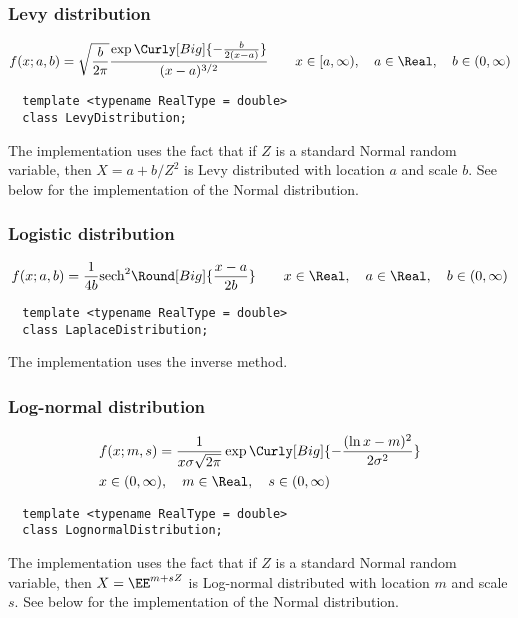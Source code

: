 \subsubsection{Levy distribution}

\begin{equation*}
  f(x;a,b) =
  \sqrt{\frac{b}{2\pi}}
  \frac{\exp\Curly[Big]{-\frac{b}{2(x - a)}}}{(x - a)^{3/2}} \qquad
  x \in [a, \infty),\quad a \in \Real,\quad b \in (0, \infty)
\end{equation*}
\begin{Verbatim}
  template <typename RealType = double>
  class LevyDistribution;
\end{Verbatim}
The implementation uses the fact that if $Z$ is a standard Normal random
variable, then $X = a + b / Z^2$ is Levy distributed with location $a$ and
scale $b$. See below for the implementation of the Normal distribution.

\subsubsection{Logistic distribution}

\begin{equation*}
  f(x;a,b) = \frac{1}{4b}\mathrm{sech}^2\Round[Big]{\frac{x - a}{2b}} \qquad
  x \in \Real,\quad a \in \Real,\quad b \in (0, \infty)
\end{equation*}
\begin{Verbatim}
  template <typename RealType = double>
  class LaplaceDistribution;
\end{Verbatim}
The implementation uses the inverse method.

\subsubsection{Log-normal distribution}

\begin{align*}
  & f(x;m,s) =
  \frac{1}{x\sigma\sqrt{2\pi}}
  \exp\Curly[Big]{-\frac{(\ln x - m)^2}{2\sigma^2}} \\
  & x \in (0, \infty),\quad m \in \Real,\quad s \in (0, \infty)
\end{align*}
\begin{Verbatim}
  template <typename RealType = double>
  class LognormalDistribution;
\end{Verbatim}
The implementation uses the fact that if $Z$ is a standard Normal random
variable, then $X = \EE^{m + sZ}$ is Log-normal distributed with location $m$
and scale $s$. See below for the implementation of the Normal distribution.

